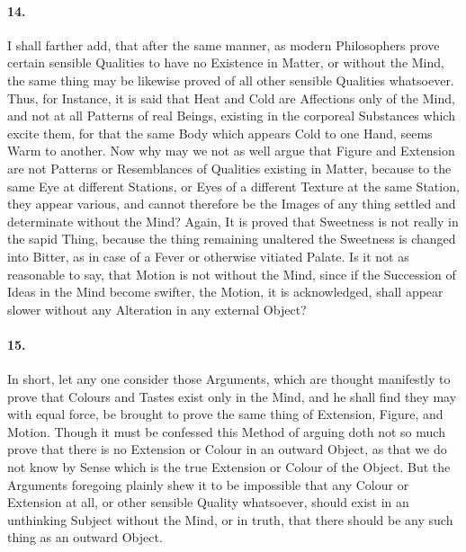 \documentclass[]{article}
\newenvironment{sectionbody}{}{}
\begin{document}
\begin{sectionbody}
\paragraph{14.} I shall farther add, that after the same manner, as modern
Philosophers prove certain sensible Qualities to have no
Existence in Matter, or without the Mind, the same thing may be
likewise proved of all other sensible Qualities whatsoever.
Thus, for Instance, it is said that Heat and Cold are Affections
only of the Mind, and not at all Patterns of real Beings,
existing in the corporeal Substances which excite them, for that
the same Body which appears Cold to one Hand, seems Warm to
another.  Now why may we not as well argue that Figure and
Extension are not Patterns or Resemblances of Qualities existing
in Matter, because to the same Eye at different Stations, or Eyes
of a different Texture at the same Station, they appear various,
and cannot therefore be the Images of any thing settled and
determinate without the Mind?  Again, It is proved that Sweetness
is not really in the sapid Thing, because the thing remaining
unaltered the Sweetness is changed into Bitter, as in case of a
Fever or otherwise vitiated Palate.  Is it not as reasonable to
say, that Motion is not without the Mind, since if the Succession
of Ideas in the Mind become swifter, the Motion, it is
acknowledged, shall appear slower without any Alteration in any
external Object?



\paragraph{15.} In short, let any one consider those Arguments, which are thought
manifestly to prove that Colours and Tastes exist only in the
Mind, and he shall find they may with equal force, be brought to
prove the same thing of Extension, Figure, and Motion.  Though it
must be confessed this Method of arguing doth not so much prove
that there is no Extension or Colour in an outward Object, as
that we do not know by Sense which is the true Extension or
Colour of the Object.  But the Arguments foregoing plainly shew
it to be impossible that any Colour or Extension at all, or other
sensible Quality whatsoever, should exist in an unthinking
Subject without the Mind, or in truth, that there should be any
such thing as an outward Object.




\end{sectionbody}
\end{document}
